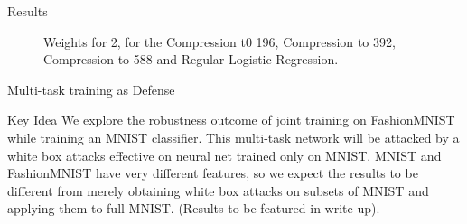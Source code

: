 \documentclass{beamer}
\begin{document}
	\begin{frame}{Results}
		\begin{figure}[h!]
			\centering
			\caption{\enspace Weights for 2, for the Compression t0 196, Compression to 392, Compression to 588 and Regular Logistic Regression.}
		\end{figure}
	\end{frame}
	
	\begin{frame}{Multi-task training as Defense}
		\begin{block}{Key Idea}
			We explore the robustness outcome of joint training on FashionMNIST while training an MNIST classifier. This multi-task network will be attacked by a white box attacks effective on neural net trained only on MNIST. MNIST and FashionMNIST have very different features, so we expect the results to be different from merely obtaining white box attacks on subsets of MNIST and applying them to full MNIST. (Results to be featured in write-up).
		\end{block}
	\end{frame}
	
\end{document}
